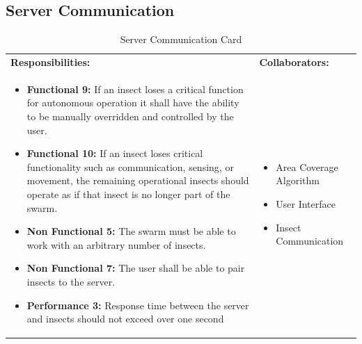 \documentclass[11pt]{article}
\begin{document}
\subsection{Server Communication}
\begin{table}[H]
\centering
\label{my-label}
\begin{tabular}{ | >{\raggedright\arraybackslash}p{} | >{\raggedright\arraybackslash}p{} | }
\hline
\multicolumn{2}{|c|}{\textbf{HydroSwarm}}             \\ \hline
\textbf{Responsibilities:} & \textbf{Collaborators:} \\ \hline
\begin{itemize}
\item \textbf{Functional 9:} If an insect loses a critical function for autonomous operation it shall have the ability to be manually overridden and controlled by
the user.
\item \textbf{Functional 10:}  If an insect loses critical functionality such as communication,
sensing, or movement, the remaining operational insects should operate as if that
insect is no longer part of the swarm.
\item \textbf{Non Functional 5:} The swarm must be able to work with an arbitrary number of
insects.
\item \textbf{Non Functional 7:} The user shall be able to pair insects to the server.
\item \textbf{Performance 3:} Response time between the server and insects should not exceed over one second
\end{itemize}
&

\begin{itemize}
\item Area Coverage Algorithm
\item User Interface
\item Insect Communication
\end{itemize} \\ \hline
\end{tabular}
\caption{Server Communication Card}
\end{table}
\end{document}
